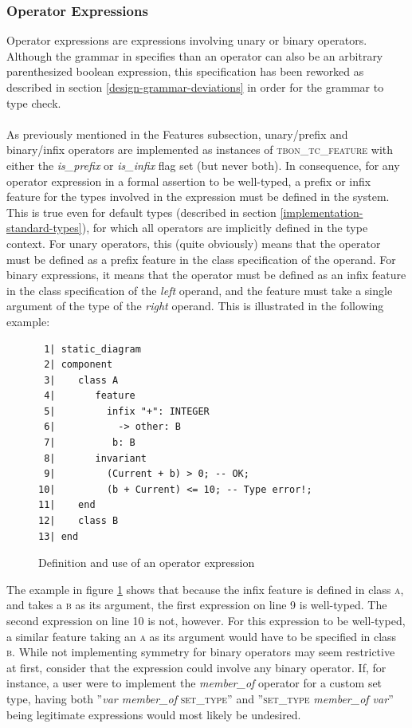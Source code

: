 \subsubsection{Operator Expressions}
Operator expressions are expressions involving unary or binary operators. Although the grammar in \cite{walden1995} specifies than an operator can also be an arbitrary parenthesized boolean expression, this specification has been reworked as described in section \ref{design-grammar-deviations} in order for the grammar to type check. 
\paragraph{}
As previously mentioned in the Features subsection, unary/prefix and binary/infix operators are implemented as instances of \textsc{tbon\_tc\_feature} with either the \textit{is\_prefix} or \textit{is\_infix} flag set (but never both). In consequence, for any operator expression in a formal assertion to be well-typed, a prefix or infix feature for the types involved in the expression must be defined in the system. This is true even for default types (described in section \ref{implementation-standard-types}), for which all operators are implicitly defined in the type context. For unary operators, this (quite obviously) means that the operator must be defined as a prefix feature in the class specification of the operand. For binary expressions, it means that the operator must be defined as an infix feature in the class specification of the \emph{left} operand, and the feature must take a single argument of the type of the \emph{right} operand. This is illustrated in the following example:
\begin{figure}[H]
{\footnotesize
\begin{verbatim}
 1| static_diagram
 2| component
 3|    class A
 4|       feature
 5|         infix "+": INTEGER
 6|           -> other: B  
 7|          b: B
 8|       invariant
 9|         (Current + b) > 0; -- OK;
10|         (b + Current) <= 10; -- Type error!;
11|    end
12|    class B
13| end
\end{verbatim}
}
\caption{Definition and use of an operator expression}
\label{fig:operator_expressions}
\end{figure}
The example in figure \ref{fig:operator_expressions} shows that because the infix feature is defined in class \textsc{a}, and takes a \textsc{b} as its argument, the first expression on line 9 is well-typed. The second expression on line 10 is not, however. For this expression to be well-typed, a similar feature taking an \textsc{a} as its argument would have to be specified in class \textsc{b}. While not implementing symmetry for binary operators may seem restrictive at first, consider that the expression could involve any binary operator. If, for instance, a user were to implement the \textit{member\_of} operator for a custom set type, having both ''\textit{var member\_of} \textsc{set\_type}''  and ''\textsc{set\_type} \textit{member\_of var}'' being legitimate expressions would most likely be undesired.
